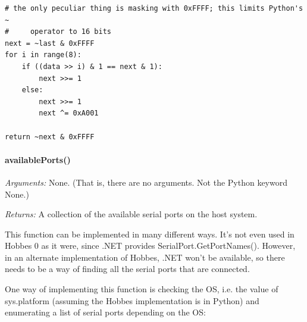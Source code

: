 \documentclass[12pt,letterpaper]{article}
\begin{document}
\selectfont

\begin{lstlisting}
# the only peculiar thing is masking with 0xFFFF; this limits Python's ~
#     operator to 16 bits
next = ~last & 0xFFFF
for i in range(8):
    if ((data >> i) & 1 == next & 1):
        next >>= 1
    else:
        next >>= 1
        next ^= 0xA001
    
return ~next & 0xFFFF
\end{lstlisting}

\selectfont



%
%
\paragraph{availablePorts()}
\label{4.3.1.1}

\emph{Arguments:} None. (That is, there are no arguments. Not the Python keyword None.)

\emph{Returns:} A collection of the available serial ports on the host system.

This function can be implemented in many different ways. It's not even used in Hobbes 0 as it were, since .NET provides SerialPort.GetPortNames(). However, in an alternate implementation of Hobbes, .NET won't be available, so there needs to be a way of finding all the serial ports that are connected.

One way of implementing this function is checking the OS, i.e. the value of sys.platform (assuming the Hobbes implementation is in Python) and enumerating a list of serial ports depending on the OS:
\end{document}

